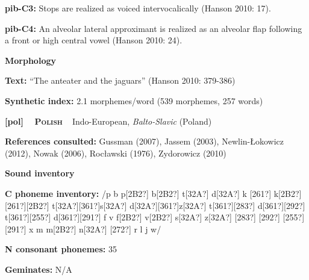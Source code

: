 \begin{styleBody}
\textbf{pib-C3: }Stops are realized as voiced intervocalically (Hanson 2010: 17).
\end{styleBody}

\begin{styleBody}
\textbf{pib-C4: }An alveolar lateral approximant is realized as an alveolar flap following a front or high central vowel (Hanson 2010: 24).
\end{styleBody}

\begin{styleBody}
\textbf{Morphology}
\end{styleBody}

\begin{styleBody}
\textbf{Text: }“The anteater and the jaguars” (Hanson 2010: 379-386)
\end{styleBody}

\begin{styleBody}
\textbf{Synthetic index: }2.1 morphemes/word (539 morphemes, 257 words)
\end{styleBody}

\clearpage\begin{styleBody}
\textbf{[pol] }\ \ \textbf{\textsc{Polish}}\textbf{\ \ }Indo-European, \textit{Balto-Slavic} (Poland)
\end{styleBody}

\begin{styleBody}
\textbf{References consulted: }Gussman (2007), Jassem (2003), Newlin-Łokowicz (2012), Nowak (2006), Rocławski (1976), Zydorowicz (2010)
\end{styleBody}

\begin{styleBody}
\textbf{Sound inventory}
\end{styleBody}

\begin{styleBody}
\textbf{C phoneme inventory:} /p b p[2B2?] b[2B2?] t[32A?] d[32A?] k [261?] k[2B2?] [261?][2B2?] t[32A?][361?]s[32A?] d[32A?][361?]z[32A?] t[361?][283?] d[361?][292?] t[361?][255?] d[361?][291?] f v f[2B2?] v[2B2?] s[32A?] z[32A?] [283?] [292?] [255?] [291?] x m m[2B2?] n[32A?] [272?] r l j w/
\end{styleBody}

\begin{styleBody}
\textbf{N consonant phonemes:} 35
\end{styleBody}

\begin{styleBody}
\textbf{Geminates:} N/A
\end{styleBody}


